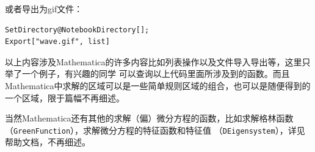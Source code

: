 \documentclass[UTF8,a4paper,10pt]{ctexart}
\begin{document}
\noindent
或者导出为gif文件：

\begin{lstlisting}
SetDirectory@NotebookDirectory[];
Export["wave.gif", list]
\end{lstlisting}
以上内容涉及Mathematica的许多内容比如列表操作以及文件导入导出等，这里只举了一个例子，有兴趣的同学
可以查询以上代码里面所涉及到的函数。而且Mathematica中求解的区域可以是一些简单规则区域的组合，也可以是随便得到的一个区域，限于篇幅不再细述。

当然Mathematica还有其他的求解（偏）微分方程的函数，比如求解格林函数（\verb|GreenFunction|），求解微分方程的特征函数和特征值
（\verb|DEigensystem|），详见帮助文档，不再细述。
\end{document}
